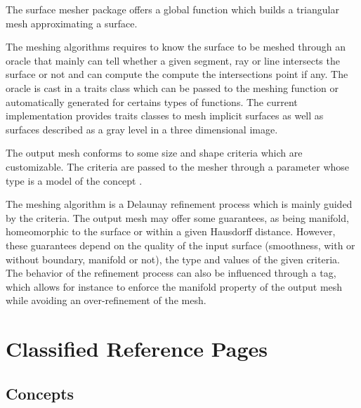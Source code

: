 

The surface mesher package offers a global function
which builds a triangular mesh approximating a surface.

The meshing algorithms requires to know the surface to be meshed
through an oracle that mainly can tell whether a
given segment, ray or line  intersects the surface or not
and can compute the compute the
intersections point if any. The oracle is cast in a traits class
which can be passed to the meshing function
or automatically generated for certains types of functions.
The current implementation provides 
traits classes 
to mesh implicit surfaces as well as  surfaces described 
as a gray level in a three
dimensional image.
 
The output mesh conforms to some size and shape criteria 
which are customizable. The criteria are passed to the mesher
through a parameter 
whose type is a model of the
concept .

The meshing algorithm is a Delaunay refinement process
which is mainly guided by the criteria. 
The output mesh may offer some guarantees, as being manifold,
homeomorphic to the surface or within a given
Hausdorff distance.  However, these guarantees depend 
on the quality of the input surface (smoothness, with or without
boundary, manifold or  not),
the type and values of the given criteria. 
The behavior of the refinement process can also be influenced through
a tag, which allows for instance to enforce the manifold property
of  the output mesh  while avoiding an over-refinement of the mesh.



\section{Classified Reference Pages}

\subsection*{Concepts}

\\
 \\
 \\
 \\
 \\
 \\
 \\



